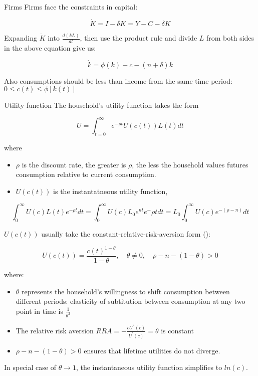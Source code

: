 \documentclass[10pt]{beamer}
\begin{document}
\begin{frame}[label={sec:org7786ece}]{Firms}
Firms face the constraints in capital:

$$
\dot{K} = I - \delta K = Y - C - \delta K
$$

Expanding \(\dot{K}\) into \(\frac{d(kL)}{dt}\), then use the product rule and divide \(L\) from both sides in the above equation give us:

$$
\dot{k} = \phi(k) - c - (n + \delta)k
$$

Also consumptions should be less than income from the same time period: \(0 \leq c(t) \leq \phi[k(t)]\)
\end{frame}

\begin{frame}[allowframebreaks]{Utility function}
The household's utility function takes the form

$$
U = \int_{t=0}^{\infty} e^{-\rho t}U(c(t))L(t)dt
$$

where
\begin{itemize}
\item \(\rho\) is the \alert{discount rate}, the greater is \(\rho\), the less the household values futures consumption relative to current consumption.
\item \(U(c(t))\) is the \alert{instantatneous utility function},
\end{itemize}

$$
\int_0^{\infty}U(c)L(t)e^{-\rho t} dt = \int_0^{\infty} U(c) L_{0} e^{nt} e^-{\rho t} dt = L_0 \int_{0}^{\infty} U(c)e^{-(\rho-n)}dt
$$


\framebreak

\(U(c(t))\) usually take the \alert{constant-relative-risk-aversion} form (\cite{arrow1965aspects,Pratt1964}):

$$
U(c(t)) = \frac{c(t)^{1-\theta}}{1-\theta}, \quad \theta \neq 0, \quad \rho - n - (1 - \theta) > 0
$$

where:
\begin{itemize}
\item \(\theta\) represents the household's willingness to shift consumption between different periods: elasticity of subtitution between consumption at any two point in time is \(\frac{1}{\theta^{2}}\)
\item The relative risk aversion \(RRA = -\frac{cU^{''}(c)}{U^{'}(c)}= \theta\)   is constant
\item \(\rho - n - (1 - \theta) > 0\) ensures that lifetime utilities do not diverge.
\end{itemize}

In special case of \(\theta \to 1\), the instantaneous utility function simplifies to \(ln(c)\).
\end{frame}
\end{document}
